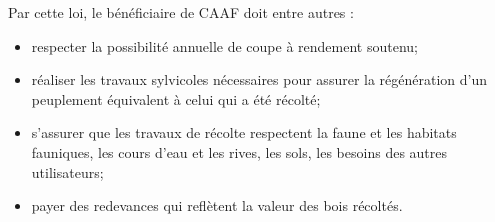 Par cette loi, le bénéficiaire de CAAF doit entre autres :

\begin{itemize}
\item respecter la possibilité annuelle de coupe à rendement soutenu;
\item réaliser les travaux sylvicoles nécessaires pour assurer la régénération d'un peuplement équivalent à celui qui a été récolté;
\item s'assurer que les travaux de récolte respectent la faune et les habitats fauniques, les cours d'eau et les rives, les sols, les besoins des autres utilisateurs;
\item payer des redevances qui reflètent la valeur des bois récoltés.

\end{itemize}


